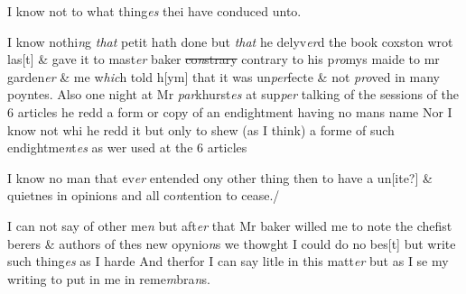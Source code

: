 \documentclass[12pt, a4paper]{book}
\begin{document}
		
				\marginpar[\vspace{0.5cm}{\textcolor{Gray}{9}}]{}
			
		
		\ifthenelse{\isodd{\thepage}}
		{\reversemarginpar}
		{\normalmarginpar}
		I know not to what thing\textit{es} thei have conduced unto.
	
	
		
				\marginpar[\vspace{0.5cm}{\textcolor{Gray}{Petitt}}]{}
			
 		
				\marginpar[\vspace{0.5cm}{\textcolor{Gray}{10}}]{}
			
 		
		\ifthenelse{\isodd{\thepage}}
		{\reversemarginpar}
		{\normalmarginpar}
		I know nothi\textit{n}g \textit{that} petit hath done but \textit{that} he delyv\textit{er}d the book coxston wrot las[t]
\& gave it to mast\textit{er} baker \sout{co\textit{n}strary}
               contrary
			 to his p\textit{ro}mys maide
			 to mr garden\textit{er} \& me w\textit{hic}h told h[ym]
 that it was un\textit{per}fecte \& not \textit{pro}ved in many poyntes. Also one night at Mr
\textit{par}khurst\textit{es} at sup\textit{per} talking of the sessions of the 6 articles he redd a form
or copy of an endightment having no mans name Nor I know not whi
he redd it but only to shew (as I think) a forme of such endightme\textit{n}t\textit{es} as
 		wer used at the 6 articles

	
				\marginpar[\vspace{0.5cm}{\textcolor{Gray}{11.}}]{}
			
	
		\ifthenelse{\isodd{\thepage}}
		{\reversemarginpar}
		{\normalmarginpar}
		I know no man that ev\textit{er} entended ony other thing then to have a un[ite?] 
\& quietnes in opinions and all co\textit{n}tention to cease./

 	
 		
				\marginpar[\vspace{0.5cm}{\textcolor{Gray}{12.}}]{}
			
 	
		\ifthenelse{\isodd{\thepage}}
		{\reversemarginpar}
		{\normalmarginpar}
		I can not say of other me\textit{n} but aft\textit{er} that Mr baker willed me to note the chefist berers \& authors of thes new opynio\textit{n}s we thowght I could do no bes[t]
but write such thing\textit{es} as I harde And therfor I can say litle in this 
matt\textit{er} but as I se my writing to put in me in reme\textit{m}bra\textit{n}s.
 	
\end{document}

